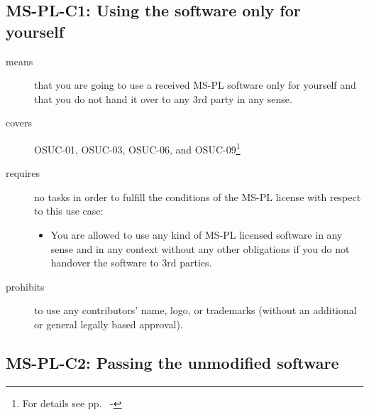 


\subsection{MS-PL-C1: Using the software only for yourself}
\label{OSUC-01-MS-PL} 
\label{OSUC-03-MS-PL} 
\label{OSUC-06-MS-PL}
\label{OSUC-09-MS-PL}
  
\begin{description}
  \item[means] that you are going to use a received MS-PL software only for
  yourself and that you do not hand it over to any 3rd party in any sense.
  \item[covers] OSUC-01, OSUC-03, OSUC-06, and OSUC-09\footnote{For details see
  pp.\ \pageref{OSUC-01-DEF} - \pageref{OSUC-09-DEF}}
  \item[requires] no tasks in order to fulfill the conditions of the MS-PL 
license with respect to this use case:
  \begin{itemize}
    \item You are allowed to use any kind of MS-PL licensed software in any
    sense and in any context without any other obligations if you do not
    handover the software to 3rd parties.
  \end{itemize}
\item[prohibits] to use any contributors' name, logo, or trademarks (without an
additional or general legally based approval).
\end{description}


\subsection{MS-PL-C2: Passing the unmodified software}
\label{OSUC-02S-MS-PL} \label{OSUC-05S-MS-PL} \label{OSUC-07S-MS-PL} 
\label{OSUC-02B-MS-PL} \label{OSUC-05B-MS-PL} \label{OSUC-07B-MS-PL} 

